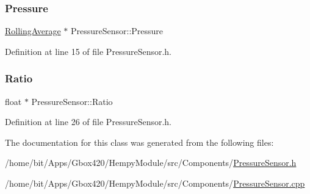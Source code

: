\subsubsection{\texorpdfstring{Pressure}{Pressure}}
{\footnotesize\ttfamily \hyperlink{class_rolling_average}{Rolling\+Average} $\ast$ Pressure\+Sensor\+::\+Pressure}



Definition at line 15 of file Pressure\+Sensor.\+h.

\mbox{\label{class_pressure_sensor_a10d297dbbef3bf72ec49c99ca6acaeaa}} 
\subsubsection{\texorpdfstring{Ratio}{Ratio}}
{\footnotesize\ttfamily float $\ast$ Pressure\+Sensor\+::\+Ratio\hspace{0.3cm}{\ttfamily [protected]}}



Definition at line 26 of file Pressure\+Sensor.\+h.



The documentation for this class was generated from the following files\+:\begin{DoxyCompactItemize}
\item 
/home/bit/\+Apps/\+Gbox420/\+Hempy\+Module/src/\+Components/\hyperlink{_hempy_module_2src_2_components_2_pressure_sensor_8h}{Pressure\+Sensor.\+h}\item 
/home/bit/\+Apps/\+Gbox420/\+Hempy\+Module/src/\+Components/\hyperlink{_hempy_module_2src_2_components_2_pressure_sensor_8cpp}{Pressure\+Sensor.\+cpp}\end{DoxyCompactItemize}
